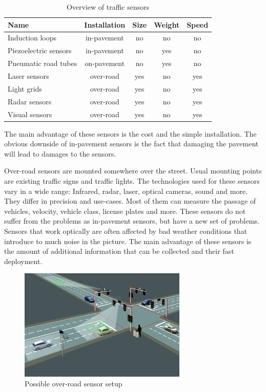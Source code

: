 \begin{table}[hb!]
	\centering
	\begin{tabular}{l|c|c|c|c}
		Name & Installation & Size & Weight & Speed \\
		\hline\hline
		Induction loops & in-pavement & no & no & no \\
		Piezoelectric sensors & in-pavement & no & yes & no \\
		Pneumatic road tubes & on-pavement & no & yes & no \\
		Laser sensors & over-road & yes & no & yes \\
		Light grids & over-road & yes & no & yes \\
		Radar sensors & over-road & yes & no & yes \\
		Visual sensors & over-road & yes & no & yes \\
	\end{tabular}
	\caption{Overview of traffic sensors}
	\label{sensor_overview}
\end{table}

The main advantage of these sensors is the cost and the simple installation. The obvious downside of in-pavement sensors is the fact that damaging the pavement will lead to damages to the sensors.

Over-road sensors are mounted somewhere over the street. Usual mounting points are existing traffic signs and traffic lights. The technologies used for these sensors vary in a wide range: Infrared, radar, laser, optical cameras, sound and more. They differ in precision and use-cases. Most of them can measure the passage of vehicles, velocity, vehicle class, license plates and more. These sensors do not suffer from the problems as in-pavement sensors, but have a new set of problems. Sensors that work optically are often affected by bad weather conditions that introduce to much noise in the picture. The main advantage of these sensors is the amount of additional information that can be collected and their fast deployment. \cite{tdh}

\begin{figure}[ht]
	\centering
	\includegraphics[width=8cm]{figures/overroad-sensor}
	\caption{Possible over-road sensor setup}
	\label{overroad-sensor}
\end{figure}

